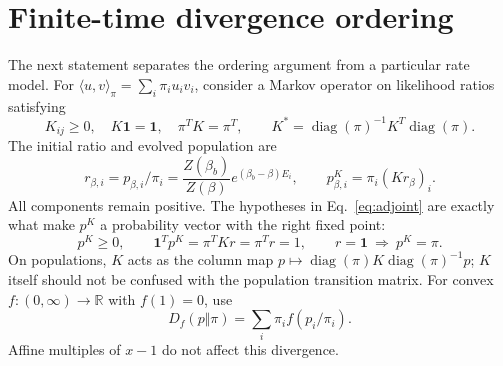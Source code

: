 \documentclass[11pt,a4paper]{article}
\theoremstyle{remark}\newtheorem{remark}[theorem]{Remark}
\newcommand{\one}{\mathbf 1}
\newcommand{\diag}{\operatorname{diag}}
\newcommand{\R}{\mathbb R}
\begin{document}
\section{Finite-time divergence ordering}\label{sec:metric}
The next statement separates the ordering argument from a particular rate model. For $\langle u,v\rangle_\pi=\sum_i\pi_i u_iv_i$, consider a Markov operator on likelihood ratios satisfying
\begin{equation}
 K_{ij}\ge0,\quad K\one=\one,\quad \pi^TK=\pi^T,
 \qquad K^*=\diag(\pi)^{-1}K^T\diag(\pi).
 \label{eq:adjoint}
\end{equation}
The initial ratio and evolved population are
\begin{equation}
 r_{\beta,i}=p_{\beta,i}/\pi_i
 =\frac{Z(\beta_b)}{Z(\beta)}e^{(\beta_b-\beta)E_i},
 \qquad p^K_{\beta,i}=\pi_i(Kr_\beta)_i.
 \label{eq:ratio}
\end{equation}
All components remain positive. The hypotheses in Eq.~\eqref{eq:adjoint} are exactly what make $p^K$ a probability vector with the right fixed point:
\begin{equation}
 p^K\ge0,\qquad \one^Tp^K=\pi^TKr=\pi^Tr=1,\qquad r=\one\ \Longrightarrow\ p^K=\pi .
\end{equation}
On populations, $K$ acts as the column map $p\mapsto\diag(\pi)K\diag(\pi)^{-1}p$; $K$ itself should not be confused with the population transition matrix. For convex $f:(0,\infty)\to\R$ with $f(1)=0$, use
\begin{equation}
 D_f(p\Vert\pi)=\sum_i\pi_i f(p_i/\pi_i).
 \label{eq:fdiv}
\end{equation}
Affine multiples of $x-1$ do not affect this divergence.
\end{document}
